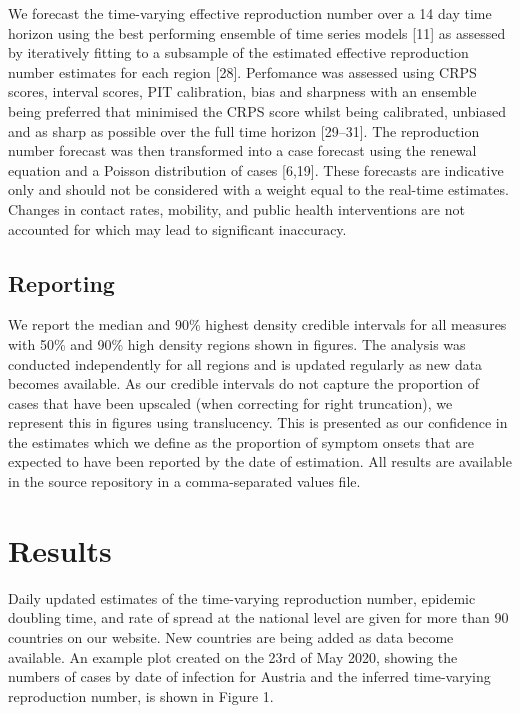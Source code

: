 \documentclass[]{article}
\begin{document}
We forecast the time-varying effective reproduction number over a 14 day
time horizon using the best performing ensemble of time series models
{[}11{]} as assessed by iteratively fitting to a subsample of the
estimated effective reproduction number estimates for each region
{[}28{]}. Perfomance was assessed using CRPS scores, interval scores,
PIT calibration, bias and sharpness with an ensemble being preferred
that minimised the CRPS score whilst being calibrated, unbiased and as
sharp as possible over the full time horizon {[}29--31{]}. The
reproduction number forecast was then transformed into a case forecast
using the renewal equation and a Poisson distribution of cases
{[}6,19{]}. These forecasts are indicative only and should not be
considered with a weight equal to the real-time estimates. Changes in
contact rates, mobility, and public health interventions are not
accounted for which may lead to significant inaccuracy.

\hypertarget{reporting}{%
\subsection{Reporting}\label{reporting}}

We report the median and 90\% highest density credible intervals for all
measures with 50\% and 90\% high density regions shown in figures. The
analysis was conducted independently for all regions and is updated
regularly as new data becomes available. As our credible intervals do
not capture the proportion of cases that have been upscaled (when
correcting for right truncation), we represent this in figures using
translucency. This is presented as our confidence in the estimates which
we define as the proportion of symptom onsets that are expected to have
been reported by the date of estimation. All results are available in
the source repository in a comma-separated values file.

\hypertarget{results}{%
\section{Results}\label{results}}

Daily updated estimates of the time-varying reproduction number,
epidemic doubling time, and rate of spread at the national level are
given for more than 90 countries on our website. New countries are being
added as data become available. An example plot created on the 23rd of
May 2020, showing the numbers of cases by date of infection for Austria
and the inferred time-varying reproduction number, is shown in Figure 1.
\end{document}
